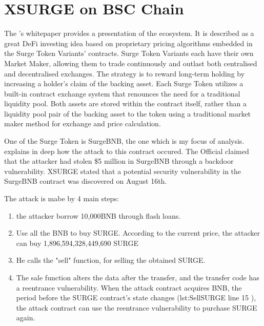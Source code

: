 \section{XSURGE on BSC Chain}   
\label{sec:Exploits:XSURGE}

The \citet{XSurgeWeb}'s whitepaper provides a presentation of the ecosystem.
It is described as a great DeFi investing idea based on proprietary pricing algorithms embedded in the Surge Token Variants' contracts.
Surge Token Variants each have their own Market Maker, allowing them to trade continuously and outlast both 
centralised and decentralised exchanges. 
The strategy is to reward long-term holding by increasing a
holder's claim of the backing asset. Each Surge Token utilizes a built-in contract exchange system that renounces the need for
a traditional liquidity pool. Both assets are stored within the contract itself, 
rather than a liquidity pool pair of the backing asset to the
token using a traditional market maker method for exchange and price calculation.

One of the Surge Token is SurgeBNB, the one which is my focus of analysis.
\citet{XSurgeBNB} explains in deep how the attack to this contract occured. 
The Official claimed that the attacker had stolen \$5 million in SurgeBNB through a backdoor vulnerability.
XSURGE stated that a potential security vulnerability in the SurgeBNB contract was discovered on August 16th.

The attack is mabe by 4 main steps:
\begin{enumerate}
    \item the attacker borrow  10,000BNB through flash loans.
    \item Use all the BNB to buy SURGE. According to the current price, 
    the attacker can buy 1,896,594,328,449,690 SURGE
    \item He calls the "sell" function, for selling the obtained SURGE.
    \item The sale function alters the data after the transfer, and the transfer code has a reentrance vulnerability.
    When the attack contract acquires BNB, the period before the SURGE contract's state changes 
    (\refname{lst:SellSURGE} line 15 ), the attack contract can use the reentrance 
    vulnerability to purchase SURGE again.
\end{enumerate}

